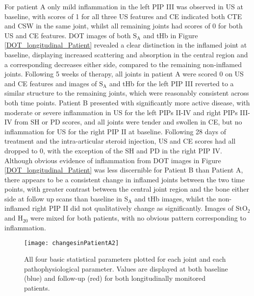 \documentclass[twoside]{bhamthesis}
\theoremstyle{definition}
\begin{document}
For patient A only mild inflammation in the left PIP III was observed in US at baseline, with scores of 1 for all three US features and CE indicated both CTE and CSW in the same joint, whilst all remaining joints had scores of 0 for both US and CE features. DOT images of both $\mathrm{S_A}$ and tHb in Figure \ref{DOT_longitudinal_Patient} revealed a clear distinction in the inflamed joint at baseline, displaying increased scattering and absorption in the central region and a corresponding decreases either side, compared to the remaining non-inflamed joints. Following 5 weeks of therapy, all joints in patient A were scored 0 on US and CE features and images of $\mathrm{S_A}$ and tHb for the left PIP III reverted to a similar structure to the remaining joints, which were reasonably consistent across both time points. Patient B presented with significantly more active disease, with moderate or severe inflammation in US for the left PIPs II-IV and right PIPs III-IV from SH or PD scores, and all joints were tender and swollen in CE, but no inflammation for US for the right PIP II at baseline. Following 28 days of treatment and the intra-articular steroid injection, US and CE scores had all dropped to 0, with the exception of the SH and PD in the right PIP IV. Although obvious evidence of inflammation from DOT images in Figure \ref{DOT_longitudinal_Patient} was less discernible for Patient B  than Patient A, there appears to be a consistent change in inflamed joints between the two time points, with greater contrast between the central joint region and the bone either side at follow up scans than baseline in $\mathrm{S_A}$ and tHb images, whilst the non-inflamed right PIP II did not qualitatively change as significantly. Images of $\mathrm{StO_2}$ and $\mathrm{H_20}$ were mixed for both patients, with no obvious pattern corresponding to inflammation.  

\begin{figure}[!ht]
\centering\texttt{[image: changesinPatientA2]}\caption{All four basic statistical parameters plotted for each joint and each pathophysiological parameter. Values are displayed at both baseline (blue) and follow-up (red) for both longitudinally monitored patients.}
\label{changesinPatientA} 
\end{figure}
\end{document}
